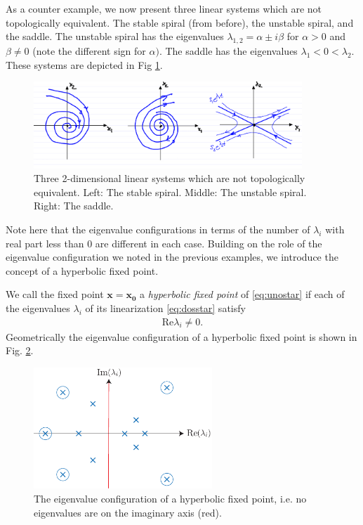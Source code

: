 \begin{ex}[Topologically inequivalent linear systems for $n=2$]
	As a counter example, we now present three linear systems which are not topologically equivalent. The stable spiral (from before), the unstable spiral, and the saddle. The unstable spiral has the eigenvalues $\lambda _{1,2}= \alpha \pm i \beta $ for $\alpha > 0$ and $\beta \neq 0$ (note the different sign for $\alpha)$. The saddle has the eigenvalues $\lambda _1 < 0 < \lambda_2$. These systems are depicted in Fig \ref{fig:topo_inequiv}.
	\begin{figure}[h!]
		\centering
		\includegraphics[width=0.9\textwidth]{figures/ch2/14topo_inequiv.png}
		\caption{Three 2-dimensional linear systems which are not topologically equivalent. Left: The stable spiral. Middle: The unstable spiral. Right: The saddle.}
		\label{fig:topo_inequiv}
	\end{figure}

	Note here that the eigenvalue configurations in terms of the number of $\lambda _i$ with real part less than $0$ are different in each case.
Building on the role of the eigenvalue configuration we noted in the previous examples, we introduce the concept of a hyperbolic fixed point.
\end{ex}
\begin{definition}
	We call the fixed point  $\bm{x} =\bm{x_0} $ a \emph{hyperbolic fixed point} of \eqref{eq:unostar} if each of the eigenvalues $\lambda_i$ of its linearization \eqref{eq:dosstar} satisfy
	\begin{align}
		\boxed{ \textrm{Re} \lambda_i \neq 0.}
	\end{align}
	Geometrically the eigenvalue configuration of a hyperbolic fixed point is shown in Fig. \ref{fig:hyperbol_ex}.
	\begin{figure}[h!]
		\centering
		\includegraphics[width=0.6\textwidth]{figures/ch2/15hyperbol_ex}
		\caption{The eigenvalue configuration of a hyperbolic fixed point, i.e. no eigenvalues are on the imaginary axis (red).}
		\label{fig:hyperbol_ex}
	\end{figure}
\end{definition}
	
